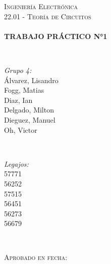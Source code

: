 \begin{titlepage}
\textsc{\Large Ingeniería Electrónica }\\[0.3cm]
\textsc{\large 22.01 - Teoría de Circuitos}\\[0.5cm] %


\HRule \\[0.4cm]
{ \huge \bfseries TRABAJO PRÁCTICO N°1\\ [0.3cm]}

\HRule \\[1.5cm]

 

\begin{minipage}{0.4\textwidth}
\begin{flushleft} \large
\emph{Grupo 4:}\\
Álvarez, Lisandro \\Fogg, Matias\\ Diaz, Ian\\Delgado, Milton\\Dieguez, Manuel\\Oh, Victor %
\end{flushleft}
\end{minipage}
~
\begin{minipage}{0.4\textwidth}
\begin{flushright} \large
\emph{Legajos:} \\
57771\\56252\\57515\\56451\\56273\\56679 
\end{flushright}
\end{minipage}\\[1cm]


 \begin{flushleft}
\textsc{\large Aprobado en fecha:  \dotfill}\\[0.5cm] 




\end{flushleft}
\end{titlepage}
